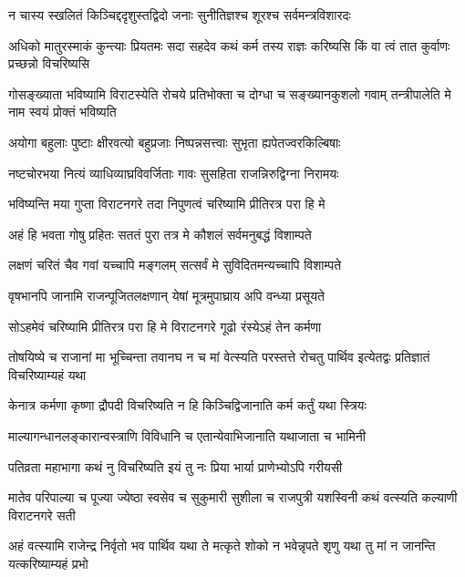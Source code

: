 \twolineshloka
{न चास्य स्खलितं किञ्चिद्ददृशुस्तद्विदो जनाः}
{सुनीतिज्ञश्च शूरश्च सर्वमन्त्रविशारदः}


\threelineshloka
{अधिको मातुरस्माकं कुन्त्याः प्रियतमः सदा}
{सहदेव कथं कर्म तस्य राज्ञः करिष्यसि}
{किं वा त्वं तात कुर्वाणः प्रच्छन्नो विचरिष्यसि}




\threelineshloka
{गोसङ्ख्याता भविष्यामि विराटस्येति रोचये}
{प्रतिभोक्ता च दोग्धा च सङ्ख्यानकुशलो गवाम्}
{तन्त्रीपालेति मे नाम स्वयं प्रोक्तं भविष्यति}


\twolineshloka
{अयोगा बहुलाः पुष्टाः क्षीरवत्यो बहुप्रजाः}
{निष्पन्नसत्त्वाः सुभृता ह्यपेतज्वरकिल्बिषाः}


\twolineshloka
{नष्टचोरभया नित्यं व्याधिव्याघ्रविवर्जिताः}
{गावः सुसहिता राजन्निरुद्विग्ना निरामयः}


\twolineshloka
{भविष्यन्ति मया गुप्ता विराटनगरे तदा}
{निपुणत्वं चरिष्यामि प्रीतिरत्र परा हि मे}


\twolineshloka
{अहं हि भवता गोषु प्रहितः सततं पुरा}
{तत्र मे कौशलं सर्वमनुबद्धं विशाम्पते}


\twolineshloka
{लक्षणं चरितं चैव गवां यच्चापि मङ्गलम्}
{सत्सर्वं मे सुविदितमन्यच्चापि विशाम्पते}


\twolineshloka
{वृषभानपि जानामि राजन्पूजितलक्षणान्}
{येषां मूत्रमुपाघ्राय अपि वन्ध्या प्रसूयते}


\twolineshloka
{सोऽहमेवं चरिष्यामि प्रीतिरत्र परा हि मे}
{विराटनगरे गूढो रंस्येऽहं तेन कर्मणा}


\threelineshloka
{तोषयिष्ये च राजानां मा भूच्चिन्ता तवानघ}
{न च मां वेत्स्यति परस्तत्ते रोचतु पार्थिव}
{इत्येतद्वः प्रतिज्ञातं विचरिष्याम्यहं यथा}




\twolineshloka
{केनात्र कर्मणा कृष्णा द्रौपदी विचरिष्यति}
{न हि किञ्चिद्विजानाति कर्म कर्तुं यथा स्त्रियः}


\twolineshloka
{माल्यागन्धानलङ्कारान्वस्त्राणि विविधानि च}
{एतान्येवाभिजानाति यथाजाता च भामिनी}


\twolineshloka
{पतिव्रता महाभागा कथं नु विचरिष्यति}
{इयं तु नः प्रिया भार्या प्राणेभ्योऽपि गरीयसी}


\threelineshloka
{मातेव परिपाल्या च पूज्या ज्येष्ठा स्वसेव च}
{सुकुमारी सुशीला च राजपुत्री यशस्विनी}
{कथं वत्स्यति कल्याणी विराटनगरे सती}




\threelineshloka
{अहं वत्स्यामि राजेन्द्र निर्वृतो भव पार्थिव}
{यथा ते मत्कृते शोको न भवेन्नृपते शृणु}
{यथा तु मां न जानन्ति यत्करिष्याम्यहं प्रभो}


